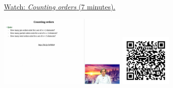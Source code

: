 
\begin{minipage}{10cm}
    \href{https://act4e-spring21.netlify.app/videos/spring2021-tradeoffs:tradeoffs:orders:counting-orders.html}{Watch: \emph{Counting orders} (7 minutes).}
        
    \href{https://act4e-spring21.netlify.app/videos/spring2021-tradeoffs:tradeoffs:orders:counting-orders.html}{\includegraphics[height=3.5cm]{spring2021-tradeoffs:tradeoffs:orders:counting-orders/thumbnails.jpg}}
    \href{https://act4e-spring21.netlify.app/videos/spring2021-tradeoffs:tradeoffs:orders:counting-orders.html}{\includegraphics[height=2.5cm]{spring2021-tradeoffs:tradeoffs:orders:counting-orders/qrcode.png}}
\end{minipage}
